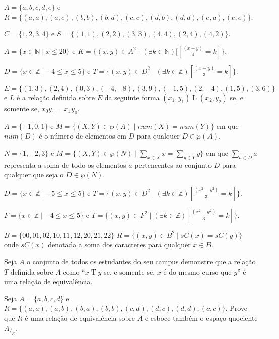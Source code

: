 \begin{exerList}
	\item $A = \{a,b,c,d,e \}$ e $R =\{(a,a),(a,e),(b,b),(b,d),(c,c),(d,b),(d,d), (e, a), (e, e)\}$.
	\item $C = \{1, 2, 3, 4\}$ e $S = \{(1, 1), (2, 2), (3, 3), (4, 4), (2, 4), (4, 2)\}$.
	\item $A = \{x \in \mathbb{N} \mid x \leq 20\}$ e $K = \{(x, y) \in A^2 \mid (\exists k \in \mathbb{N})[[\displaystyle\frac{(x - y)}{4} = k]\}$.
	\item $D = \{x \in \mathbb{Z} \mid -4 \leq x \leq 5\}$ e $T = \{(x, y) \in D^2 \mid (\exists k \in \mathbb{Z})[\displaystyle\frac{(x - y)}{3} = k]\}$.
	\item $E = \{(1, 3), (2,4), (0, 3), (-4, -8), (3, 9), (-1, 5), (2, -4), (1, 5), (3, 6)\}$ e $L$ é a relação definida sobre $E$ da seguinte forma $(x_1, y_1) \mathrel{L} (x_2, y_2)$ se, e somente se, $x_0y_1 = x_1y_0$.
	\item $A = \{-1, 0, 1\}$ e $M = \{(X, Y) \in \wp(A) \mid num(X) = num(Y)\}$ em que $num(D)$ é o número de elementos em $D$ para qualquer $D \in \wp(A)$.
	\item $N = \{1, -2, 3\}$ e $M = \Big\{(X, Y) \in \wp(N) \mid \displaystyle\sum_{x \in X} x = \displaystyle\sum_{y \in Y} y\Big\}$ em que $\displaystyle\sum_{a \in D} a$  representa a soma de todo os elementos $a$ pertencentes ao conjunto $D$ para qualquer que seja o $D \in \wp(N)$.
	\item $D = \{x \in \mathbb{Z} \mid -5 \leq x \leq 5\}$ e $T = \{(x, y) \in D^2 \mid (\exists k \in \mathbb{Z})[\displaystyle\frac{(x^2 - y^2)}{3} = k]\}$.
	\item $F = \{x \in \mathbb{Z} \mid -4 \leq x \leq 5\}$ e $T = \{(x, y) \in F^2 \mid (\exists k \in \mathbb{Z})[\displaystyle\frac{(x^2 - y^2)}{3} = k]\}$.
	\item $B = \{00, 01, 02, 10, 11, 12, 20, 21, 22\}$ $R = \{(x, y) \in B^2 \mid  sC(x) = sC(y)\}$ onde $sC(x)$ denotada a soma dos caracteres para qualquer $x \in B$.
\end{exerList}

\begin{problem}\label{prob:EquivalenciaOrdem4}
	Seja $A$ o conjunto de todos os estudantes do seu campus demonstre que a relação $T$ definida sobre $A$ como ``$x \mathrel{T} y$ se, e somente se, $x$ é do mesmo curso que $y$'' é uma relação de equivalência.
\end{problem}

\begin{problem}\label{prob:EquivalenciaOrdem5}
	Seja $A = \{a, b, c, d\}$ e $R = \{(a, a), (a, b), (b, a), (b, b), (c, d), (d, c), (d,d), (c, c)\}$. Prove que $R$ é uma relação de equivalência sobre $A$ e esboce também o espaço quociente $A_{/_R}$.
\end{problem}


